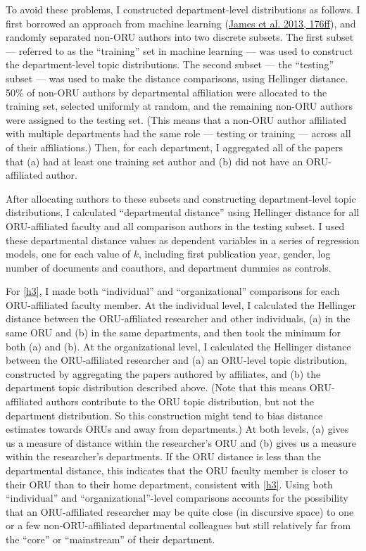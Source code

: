 \documentclass[
  11pt,
]{article}
\begin{document}
To avoid these problems, I constructed department-level distributions as follows. I first borrowed an approach from machine learning (\protect\hyperlink{ref-JamesIntroductionStatisticalLearning2013}{James et al. 2013, 176ff}), and randomly separated non-ORU authors into two discrete subsets. The first subset --- referred to as the ``training'' set in machine learning --- was used to construct the department-level topic distributions. The second subset --- the ``testing'' subset --- was used to make the distance comparisons, using Hellinger distance. 50\% of non-ORU authors by departmental affiliation were allocated to the training set, selected uniformly at random, and the remaining non-ORU authors were assigned to the testing set. (This means that a non-ORU author affiliated with multiple departments had the same role --- testing or training --- across all of their affiliations.) Then, for each department, I aggregated all of the papers that (a) had at least one training set author and (b) did not have an ORU-affiliated author.

After allocating authors to these subsets and constructing department-level topic distributions, I calculated ``departmental distance'' using Hellinger distance for all ORU-affiliated faculty and all comparison authors in the testing subset. I used these departmental distance values as dependent variables in a series of regression models, one for each value of \(k\), including first publication year, gender, log number of documents and coauthors, and department dummies as controls.

For \ref{h3}, I made both ``individual'' and ``organizational'' comparisons for each ORU-affiliated faculty member. At the individual level, I calculated the Hellinger distance between the ORU-affiliated researcher and other individuals, (a) in the same ORU and (b) in the same departments, and then took the minimum for both (a) and (b). At the organizational level, I calculated the Hellinger distance between the ORU-affiliated researcher and (a) an ORU-level topic distribution, constructed by aggregating the papers authored by affiliates, and (b) the department topic distribution described above. (Note that this means ORU-affiliated authors contribute to the ORU topic distribution, but not the department distribution. So this construction might tend to bias distance estimates towards ORUs and away from departments.) At both levels, (a) gives us a measure of distance within the researcher's ORU and (b) gives us a measure within the researcher's departments. If the ORU distance is less than the departmental distance, this indicates that the ORU faculty member is closer to their ORU than to their home department, consistent with \ref{h3}. Using both ``individual'' and ``organizational''-level comparisons accounts for the possibility that an ORU-affiliated researcher may be quite close (in discursive space) to one or a few non-ORU-affiliated departmental colleagues but still relatively far from the ``core'' or ``mainstream'' of their department.
\end{document}
